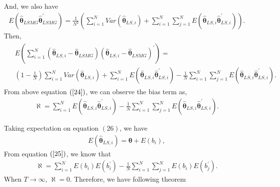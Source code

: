 \documentclass[12pt,a4paper,hyperref]{article}
\begin{document}
And, we also have
\begin{align}
E \left(\hat{\boldsymbol{\theta}}_{LSMG}\hat{\boldsymbol{\theta}}^{'}_{LSMG} \right)=\frac{1}{N^{2}}\left( \sum^{N}_{i=1}Var\left(\hat{\boldsymbol{\theta}}_{LS,i}\right)+ \sum^{N}_{i=1}\sum^{N}_{j=1}E \left(\hat{\boldsymbol{\theta}}_{LS,i}\hat{\boldsymbol{\theta}}^{'}_{LS,i} \right) \right).
\end{align}
Then,
\begin{align}
\begin{split}
&E\left( \sum^{N}_{i=1}\left( \hat{\boldsymbol{\theta}}_{LS,i}- \hat{\boldsymbol{\theta}}_{LSMG}\right)\left( \hat{\boldsymbol{\theta}}_{LS,i}- \hat{\boldsymbol{\theta}}_{LSMG}\right)^{'} \right)= \\
&\left(1-\frac{1}{N} \right)\sum^{N}_{i=1}Var\left(\hat{\boldsymbol{\theta}}_{LS,i}\right)+ \sum^{N}_{i=1}E \left(\hat{\boldsymbol{\theta}}_{LS,i}\hat{\boldsymbol{\theta}}^{'}_{LS,i} \right)- \frac{1}{N}\sum^{N}_{i=1}\sum^{N}_{j=1}E \left(\hat{\boldsymbol{\theta}}_{LS,i}\hat{\boldsymbol{\theta}}^{'}_{LS,i} \right). \label{24}
\end{split}
\end{align}
From above equation $(\ref{24})$, we can observe the bias term as,
\begin{align}
\aleph=\sum^{N}_{i=1}E \left(\hat{\boldsymbol{\theta}}_{LS,i}\hat{\boldsymbol{\theta}}^{'}_{LS,i} \right)- \frac{1}{N}\sum^{N}_{i=1}\sum^{N}_{j=1}E \left(\hat{\boldsymbol{\theta}}_{LS,i}\hat{\boldsymbol{\theta}}^{'}_{LS,i} \right). \label{25}
\end{align}

 Taking expectation on equation $(26)$, we have
\begin{align}
E\left( \hat{\boldsymbol{\theta}}_{LS,i} \right)=\boldsymbol{\theta}+E \left(b_{i} \right),
\end{align}
From equation $(\ref{25})$, we know that
 \begin{align}
\aleph=\sum^{N}_{i=1}E \left(b_{i}\right) E\left(b^{'}_{i} \right)- \frac{1}{N}\sum^{N}_{i=1}\sum^{N}_{j=1}E \left(b_{i}\right) E\left(b^{'}_{j} \right).
 \end{align}
When $T \to \infty$, $\aleph=0$.
Therefore, we have following theorem \\
\end{document}
